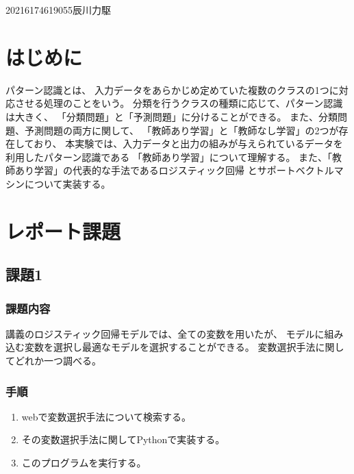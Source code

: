 \documentclass[12pt]{jarticle}
\begin{document}
{2021}{6}{17}{4619055}{辰川力駆}
\section{はじめに}
パターン認識とは、
入力データをあらかじめ定めていた複数のクラスの1つに対応させる処理のことをいう。
分類を行うクラスの種類に応じて、パターン認識は大きく、
「分類問題」と「予測問題」に分けることができる。
また、分類問題、予測問題の両方に関して、
「教師あり学習」と「教師なし学習」の2つが存在しており、
本実験では、入力データと出力の組みが与えられているデータを利用したパターン認識である
「教師あり学習」について理解する。
また、「教師あり学習」の代表的な手法であるロジスティック回帰
とサポートベクトルマシンについて実装する。

\section{レポート課題}
\subsection{課題1}
\subsubsection*{課題内容}
講義のロジスティック回帰モデルでは、全ての変数を用いたが、
モデルに組み込む変数を選択し最適なモデルを選択することができる。
変数選択手法に関してどれか一つ調べる。
\subsubsection*{手順}
\begin{enumerate}
    \item webで変数選択手法について検索する。
    \item その変数選択手法に関してPythonで実装する。
    \item このプログラムを実行する。
\end{enumerate}
\end{document}
